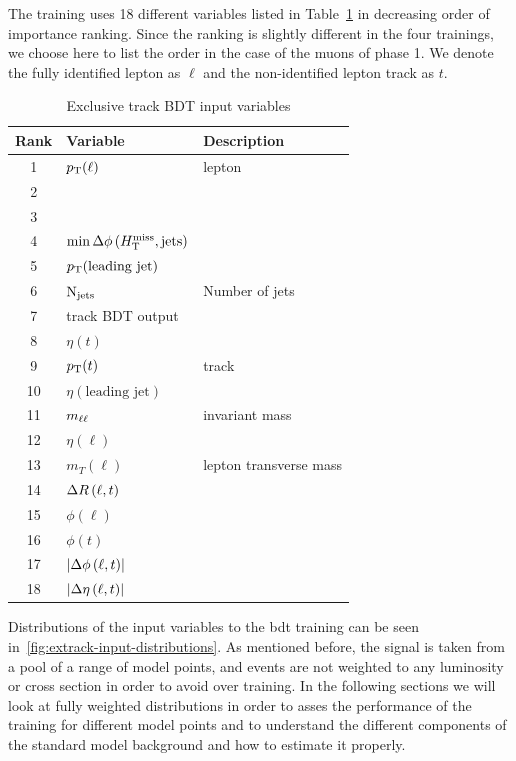 The training uses 18 different variables listed in Table~\ref{tab:extrack-bdt-variables} in decreasing order of importance ranking. Since the ranking is slightly different in the four trainings, we choose here to list the order in the case of the muons of phase 1. We denote the fully identified lepton as $\ell$ and the non-identified lepton track as $t$.

\begin{table}[!htb]
	\centering
	\label{tab:extrack-bdt-variables}
		\caption{Exclusive track BDT input variables}
			\begin{tabular}{cll} \hline
			Rank & Variable & Description \\ \hline
			1 & $p_{\mathrm{T}}(\ell)$ & lepton \pt\\
			2 & \HT & \\
			3 & \mht & \\
			4 & $\min{\Delta\phi\left(\ensuremath{H_{\mathrm{T}}^{\text{miss}}},\mathrm{jets}\right)}$ & \\
			5 & $p_{\mathrm{T}}(\text{leading jet})$ & \\
			6 & $\mathrm{N}_{\mathrm{jets}}$ & Number of jets \\					7 & track BDT output & \\
			8 & $\eta(t)$ & \\
			9 & $p_{\mathrm{T}}(t)$ & track \pt\\
			10 & $\eta(\text{leading jet})$ & \\				11 & $m_{\ell\ell}$ & invariant mass \\
			12 & $\eta(\ell)$ & \\
			13 & $m_T(\ell)$ & lepton transverse mass\\			
			14 & $\Delta R\left(\ell, t\right)$ & \\
			15 & $\phi(\ell)$ & \\
			16 & $\phi(t)$ & \\
			17 & $\lvert \Delta\phi\left(\ell,t \right) \rvert$ & \\			
			18 & $\lvert \Delta \eta \left(\ell, t\right)  \rvert$ & \\			
			\hline
			\end{tabular}
\end{table}

Distributions of the input variables to the \gls{bdt} training can be seen in~\ref{fig:extrack-input-distributions}. As mentioned before, the signal is taken from a pool of a range of model points, and events are not weighted to any luminosity or cross section in order to avoid over training. In the following sections we will look at fully weighted distributions in order to asses the performance of the training for different model points and to understand the different components of the standard model background and how to estimate it properly.

